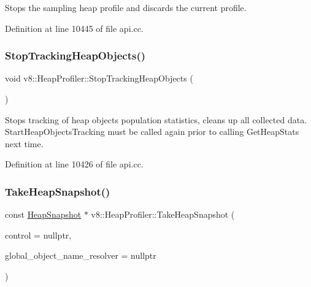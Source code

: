 Stops the sampling heap profile and discards the current profile. 

Definition at line 10445 of file api.\+cc.

\mbox{\label{classv8_1_1HeapProfiler_ae448d9474ae34781133d4a4547b08cb1}} 
\subsubsection{\texorpdfstring{Stop\+Tracking\+Heap\+Objects()}{StopTrackingHeapObjects()}}
{\footnotesize\ttfamily void v8\+::\+Heap\+Profiler\+::\+Stop\+Tracking\+Heap\+Objects (\begin{DoxyParamCaption}{ }\end{DoxyParamCaption})}

Stops tracking of heap objects population statistics, cleans up all collected data. Start\+Heap\+Objects\+Tracking must be called again prior to calling Get\+Heap\+Stats next time. 

Definition at line 10426 of file api.\+cc.

\mbox{\label{classv8_1_1HeapProfiler_a0e6e52dd0a3dd4f5702294b87a30de3d}} 
\subsubsection{\texorpdfstring{Take\+Heap\+Snapshot()}{TakeHeapSnapshot()}}
{\footnotesize\ttfamily const \mbox{\hyperlink{classv8_1_1HeapSnapshot}{Heap\+Snapshot}} $\ast$ v8\+::\+Heap\+Profiler\+::\+Take\+Heap\+Snapshot (\begin{DoxyParamCaption}\item[{\mbox{\hyperlink{classv8_1_1ActivityControl}{Activity\+Control}} $\ast$}]{control = {\ttfamily nullptr},  }\item[{\mbox{\hyperlink{classv8_1_1HeapProfiler_1_1ObjectNameResolver}{Object\+Name\+Resolver}} $\ast$}]{global\+\_\+object\+\_\+name\+\_\+resolver = {\ttfamily nullptr} }\end{DoxyParamCaption})}


